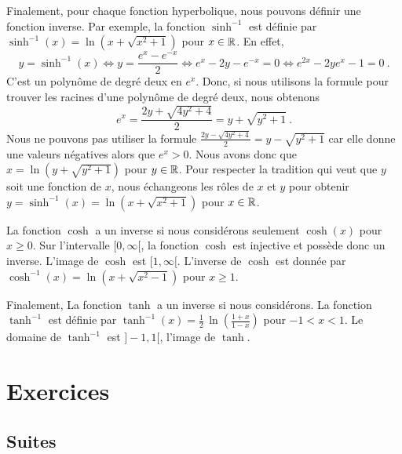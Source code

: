 {Finalement, pour chaque fonction hyperbolique, nous pouvons définir une
fonction inverse.  Par exemple, la fonction $\sinh^{-1}$ est définie
par $\displaystyle \sinh^{-1}(x) = \ln(x+\sqrt{x^2+1})$ pour
$x\in \mathbb{R}$.  En effet,
\[
y = \sinh^{-1}(x)  \Leftrightarrow y = \frac{e^x - e^{-x}}{2} 
\Leftrightarrow e^x- 2y - e^{-x} = 0 \Leftrightarrow
e^{2x}-2y e^x - 1 = 0 \ .
\]
C'est un polynôme de degré deux en $e^x$.  Donc, si nous utilisons la
formule pour trouver les racines d'une polynôme de degré deux, nous
obtenons
\[
e^x = \frac{2y + \sqrt{4y^2 +4}}{2} = y +\sqrt{y^2+1} \ .
\]
Nous ne pouvons pas utiliser la formule
$\displaystyle \frac{2y - \sqrt{4y^2 +4}}{2} = y -\sqrt{y^2+1}$ car elle
donne une valeurs négatives alors que $e^x >0$.  Nous avons donc
que $x = \ln(y+\sqrt{y^2+1})$ pour $y\in \mathbb{R}$.  Pour respecter la
tradition qui veut que $y$ soit une fonction de $x$, nous échangeons
les rôles de $x$ et $y$ pour obtenir
$y = \sinh^{-1}(x) = \ln(x+\sqrt{x^2+1})$ pour $x\in \mathbb{R}$.

La fonction $\cosh$ a un inverse si nous considérons seulement
$\cosh(x)$ pour $x\geq 0$.  Sur l'intervalle $[0,\infty[$, la fonction
$\cosh$ est injective et possède donc un inverse.  L'image de $\cosh$
est $[1,\infty[$.  L'inverse de $\cosh$ est donnée par
$\cosh^{-1}(x) = \ln(x+\sqrt{x^2-1})$ pour $x\geq 1$.

Finalement, La fonction $\tanh$ a un inverse si nous considérons.
La fonction $\tanh^{-1}$ est définie par
$\displaystyle \tanh^{-1}(x) = \frac{1}{2}\,\ln\left(\frac{1+x}{1-x}\right)$
pour $-1 < x < 1$.  Le domaine de $\tanh^{-1}$ est $]-1,1[$, l'image
de $\tanh$.

}  %

\section{Exercices}

\subsection{Suites}

